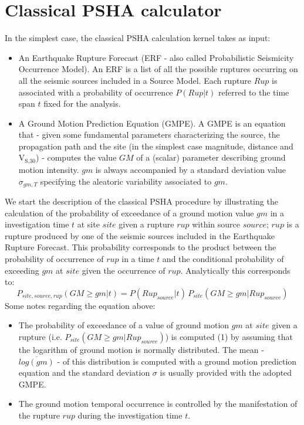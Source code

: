 %
\section{Classical PSHA calculator}
\label{chap:classic_psha}
%
In the simplest case, the classical PSHA calculation kernel takes as input: 
%
\begin{itemize}
%
\item An Earthquake Rupture Forecast (ERF - also called Probabilistic 
Seismicity Occurrence Model). An ERF is a list of all the possible ruptures
occurring on all the seismic sources included in a Source Model. Each 
rupture $Rup$ is associated with a probability of occurrence $P(Rup|t)$ 
referred to the time span $t$ fixed for the analysis. 
%
\item A Ground Motion Prediction Equation (GMPE). A GMPE is an equation 
that - given some fundamental parameters characterizing the source, the 
propagation
path and the site (in the simplest case magnitude, distance and 
V$_\text{S,30}$) - computes the value $GM$ of a (scalar) parameter 
describing ground motion intensity. $gm$ is always accompanied by a 
standard deviation value $\sigma_{gm,T}$ specifying the aleatoric 
variability associated to $gm$.
\end{itemize}

We start the description of the classical PSHA procedure by illustrating
the calculation of the probability of exceedance of a ground motion value
$gm$ in a investigation time $t$ at site $site$ given a rupture $rup$ 
within source $source$; $rup$ is a rupture produced by one of the seismic
sources included in the Earthquake Rupture Forecast. 
%
This probability corresponds to the product between the probability of
occurrence of $rup$ in a time $t$ and the conditional probability of 
exceeding $gm$ at $site$ given the occurrence of $rup$. Analytically this 
corresponds to:
\begin{equation}
P_{site,source,rup}(GM \geq gm|t) = P(Rup_{source}|t)\,P_{site}(GM\geq gm|Rup_{source})
\label{eq:prob_gm_ex_one_rup}
\end{equation}
%
Some notes regarding the equation above:
\begin{itemize}
\item The probability of exceedance of a value of ground motion $gm$ at $site$ 
given a rupture (i.e. $P_{site}(GM\geq gm|Rup_{source})$) is computed (1) by 
assuming that the logarithm of ground motion is normally distributed. The 
mean - $\overline{log(gm)}$ - of this distribution is computed with a ground
motion prediction equation and the standard deviation $\sigma$ is usually 
provided with the adopted GMPE.
\item The ground motion temporal occurrence is controlled by the manifestation
of the rupture $rup$ during the investigation time $t$.  
\end{itemize}

